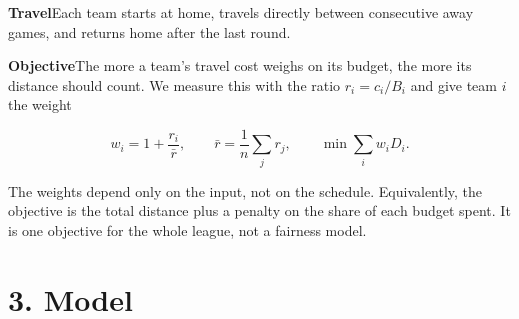 \documentclass[10pt,a4paper,twocolumn]{article}
\newcommand{\head}[1]{\textbf{\color{accent}#1}\quad}   %
\begin{document}
\head{Travel}Each team starts at home, travels directly between
consecutive away games, and returns home after the last round.

\head{Objective}The more a team's travel cost weighs on
its budget, the more its distance should count. We measure this with
the ratio $r_i = c_i/B_i$ and give team $i$ the weight
\begin{keybox}
\vspace{-8pt}
\[
w_i = 1 + \frac{r_i}{\bar r},
\qquad \bar r = \frac{1}{n}\sum_{j} r_j,
\qquad \min \sum_{i} w_i D_i .
\]
\vspace{-12pt}
\end{keybox}
\noindent The weights depend only on the input, not on the schedule. Equivalently,
the objective is the total distance plus a penalty on the share of each
budget spent. It is one objective for the whole league, not a fairness model.

\section*{3. Model}
\end{document}
